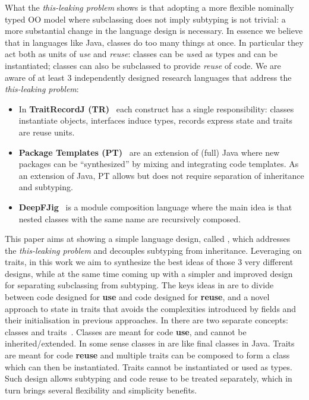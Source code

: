 What the \emph{this-leaking problem} shows is that adopting a more flexible
nominally typed OO model where subclassing does not imply subtyping is
not trivial: a more substantial change in the language design is
necessary.  In essence we believe that in languages like Java, classes do too many
things at once. In particular they act both as units of \emph{use} and
\emph{reuse}: classes can be \emph{use}d as types and can be instantiated;
classes can also be subclassed to provide \emph{reuse} of code.
We are aware of at least 3 independently designed research
languages that address the \emph{this-leaking problem}:
\begin{itemize}
\item In {\bf TraitRecordJ (TR)}~\cite{Bettini:2010:ISP:1774088.1774530,BETTINI2013521,Bettini2015282}
each construct has a single responsibility: classes instantiate objects,
interfaces induce types, records express state and traits are reuse units.
\item {\bf Package Templates (PT)}~\cite{KrogdahlMS09,DBLP:journals/taosd/AxelsenSKM12,DBLP:conf/gpce/AxelsenK12}
are an extension of (full) Java where new packages can be ``synthesized'' by mixing
and integrating code templates. As an extension of Java, PT allows but does not require
separation of inheritance and subtyping.
\item {\bf
    DeepFJig}~\cite{deep,servetto2014meta,fjig} is
a module composition language where the main idea is that
nested classes with the same name are recursively composed.
\end{itemize}
This paper aims at showing a simple language design, called \name,
which addresses the \emph{this-leaking problem} and decouples subtyping from inheritance.
Leveraging on traits, in this work we aim to synthesize the best ideas
of those 3 very different designs, while at the same time coming up with a simpler and
improved design for separating subclassing from subtyping.
The keys ideas in \name are to divide between code designed for
\textbf{use} and code designed for \textbf{reuse}, and a novel
approach to state in traits that avoids the complexities introduced by
fields and their initialisation in previous approaches.
In \name there are two separate concepts: classes
and traits~\cite{Traits:ECOOP2003}. Classes are meant for code \textbf{use}, and cannot be inherited/extended. In some sense classes in \name are like final classes in
Java. Traits are meant for code \textbf{reuse} and multiple traits can be
composed to form a class which can then be instantiated. Traits 
cannot be instantiated or used as types. Such design allows
subtyping and code reuse to be treated separately, which in turn
brings several flexibility and simplicity benefits.

